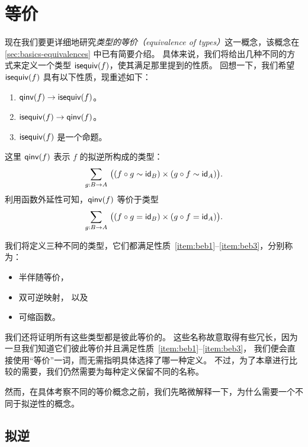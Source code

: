 \chapter{等价}
\label{cha:equivalences}

现在我们要更详细地研究\emph{类型的等价（equivalence of types）}这一概念，该概念在 \cref{sec:basics-equivalences} 中已有简要介绍。
具体来说，我们将给出几种不同的方式来定义一个类型 $\mathsf{isequiv}(f)$，使其满足那里提到的性质。
回想一下，我们希望 $\mathsf{isequiv}(f)$ 具有以下性质，现重述如下：

\begin{enumerate}
\item $\mathsf{qinv}(f) \to \mathsf{isequiv} (f)$。\label{item:beb1}
\item $\mathsf{isequiv} (f) \to \mathsf{qinv}(f)$。\label{item:beb2}
\item $\mathsf{isequiv}(f)$ 是一个命题。\label{item:beb3}
\end{enumerate}

这里 $\mathsf{qinv}(f)$ 表示 $f$ 的拟逆所构成的类型：
\begin{equation*}
  \sm{g:B\to A} \big((f \circ g \htpy \idfunc[B]) \times (g\circ f \htpy \idfunc[A])\big).
\end{equation*}
利用函数外延性可知，$\mathsf{qinv}(f)$ 等价于类型
\begin{equation*}
  \sm{g:B\to A} \big((f \circ g = \idfunc[B]) \times (g\circ f = \idfunc[A])\big).
\end{equation*}

我们将定义三种不同的类型，它们都满足性质~\ref{item:beb1}--\ref{item:beb3}，分别称为：

\begin{itemize}
\item 半伴随等价，
\item 双可逆映射，
  以及
\item 可缩函数。
\end{itemize}

我们还将证明所有这些类型都是彼此等价的。
这些名称故意取得有些冗长，因为一旦我们知道它们彼此等价并且满足性质~\ref{item:beb1}--\ref{item:beb3}，
我们便会直接使用``等价''一词，而无需指明具体选择了哪一种定义。
不过，为了本章进行比较的需要，我们仍然需要为每种定义保留不同的名称。

然而，在具体考察不同的等价概念之前，我们先略微解释一下，为什么需要一个不同于拟逆性的概念。

\section{拟逆}
\label{sec:quasi-inverses}

